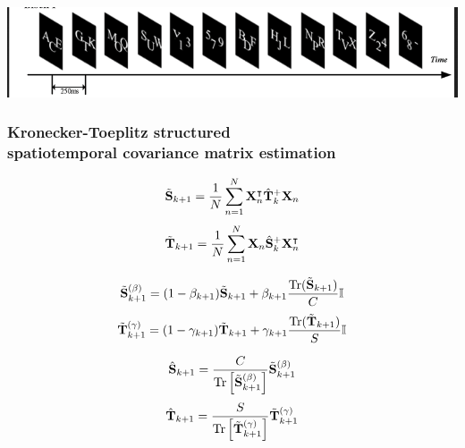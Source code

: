 \documentclass{kul-ulille-beamer}
\begin{document}
\begin{frame}[noframenumbering]
  \bigskip
  \bigskip

  \includegraphics[width=.7\textwidth]{figures/supp/rsvp.png}

\end{frame}


\begin{frame}[noframenumbering]
  \frametitle{Kronecker-Toeplitz structured \\ spatiotemporal covariance matrix estimation}
  \scriptsize
  \begin{minipage}{.2\textwidth}
		$$
      \tilde{\mathbf{S}}_{k+1} =
			\frac{1}{N}
      \sum^N_{n=1}\mathbf{X}_n^\intercal\hat{\mathbf{T}}_k^+\mathbf{X}_n
			\label{eq:stbf-struct/fpi-spatial}
		$$
		$$
      \tilde{\mathbf{T}}_{k+1} =
			\frac{1}{N}
      \sum^N_{n=1}\mathbf{X}_n\hat{\mathbf{S}}_k^+\mathbf{X}_n^\intercal
			\label{eq:stbf-struct/fpi-temporal}
		$$
  \end{minipage}\hfill\vrule\hfill%
  \begin{minipage}{.4\textwidth}
		$$
      \tilde{\mathbf{S}}_{k+1}^{(\beta)} =
      (1-\beta_{k+1})\tilde{\mathbf{S}}_{k+1}
      +\beta_{k+1}\frac{\mathop{\mathrm{Tr}}(\tilde{\mathbf{S}}_{k+1})}{C}\mathbb{I}
			\label{eq:stbf-struct/fpi-spatial-shrunk}
		$$
		$$
      \tilde{\mathbf{T}}_{k+1}^{(\gamma)} =
      (1-\gamma_{k+1})\tilde{\mathbf{T}}_{k+1}
      +\gamma_{k+1}\frac{\mathop{\mathrm{Tr}}(\tilde{\mathbf{T}}_{k+1})}{S}\mathbb{I}
			\label{eq:stbf-struct/fpi-temporal-shrunk}
		$$
  \end{minipage}\hfill\vrule\hfill%
  \begin{minipage}{.2\textwidth}
		$$
      \hat{\mathbf{S}}_{k+1} =
      \frac{C}{\mathop{\mathrm{Tr}}\left[\tilde{\mathbf{S}}_{k+1}^{(\beta)}\right]}
      \tilde{\mathbf{S}}_{k+1}^{(\beta)}
			\label{eq:stbf-struct/fpi-spatial-norm}
		$$
		$$
      \hat{\mathbf{T}}_{k+1} =
      \frac{S}{\mathop{\mathrm{Tr}}\left[\tilde{\mathbf{T}}_{k+1}^{(\gamma)}\right]}
      \tilde{\mathbf{T}}_{k+1}^{(\gamma)}
			\label{eq:stbf-struct/fpi-temporal-norm}
		$$
  \end{minipage}


\end{frame}
\end{document}
